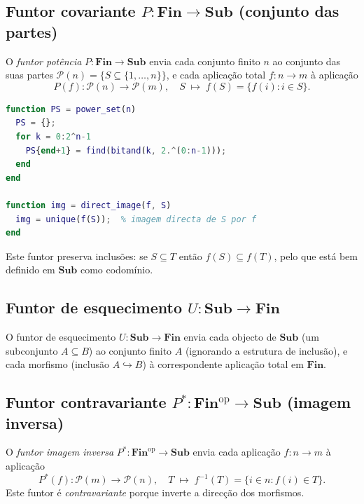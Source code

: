 \documentclass[12pt,a4paper]{article}
\newcommand{\catname}[1]{\mathbf{#1}}
\newcommand{\Fin}{\catname{Fin}}
\newcommand{\Sub}{\catname{Sub}}
\begin{document}
\subsection{Funtor covariante \texorpdfstring{$P \colon \Fin \to \Sub$}{P: Fin -> Sub} (conjunto das partes)}

O \emph{funtor potência} $P \colon \Fin \to \Sub$ envia cada conjunto finito $n$ ao conjunto das suas partes $\mathcal{P}(n) = \{S \subseteq \{1,\ldots,n\}\}$, e cada aplicação total $f \colon n \to m$ à aplicação
\[
  P(f) \colon \mathcal{P}(n) \to \mathcal{P}(m), \quad S \;\longmapsto\; f(S) = \{f(i) : i \in S\}.
\]

\begin{lstlisting}[language=Matlab, caption={Funtor potência $P$}]
function PS = power_set(n)
  PS = {};
  for k = 0:2^n-1
    PS{end+1} = find(bitand(k, 2.^(0:n-1)));
  end
end

function img = direct_image(f, S)
  img = unique(f(S));  % imagem directa de S por f
end
\end{lstlisting}

\noindent Este funtor preserva inclusões: se $S \subseteq T$ então $f(S) \subseteq f(T)$, pelo que está bem definido em $\Sub$ como codomínio.

\subsection{Funtor de esquecimento \texorpdfstring{$U \colon \Sub \to \Fin$}{U: Sub -> Fin}}

O funtor de esquecimento $U \colon \Sub \to \Fin$ envia cada objecto de $\Sub$ (um subconjunto $A \subseteq B$) ao conjunto finito $A$ (ignorando a estrutura de inclusão), e cada morfismo (inclusão $A \hookrightarrow B$) à correspondente aplicação total em $\Fin$.

\subsection{Funtor contravariante \texorpdfstring{$P^* \colon \Fin^{\mathrm{op}} \to \Sub$}{P*: Fin^op -> Sub} (imagem inversa)}

O \emph{funtor imagem inversa} $P^* \colon \Fin^{\mathrm{op}} \to \Sub$ envia cada aplicação $f \colon n \to m$ à aplicação
\[
  P^*(f) \colon \mathcal{P}(m) \to \mathcal{P}(n), \quad T \;\longmapsto\; f^{-1}(T) = \{i \in n : f(i) \in T\}.
\]
Este funtor é \emph{contravariante} porque inverte a direcção dos morfismos.
\end{document}
